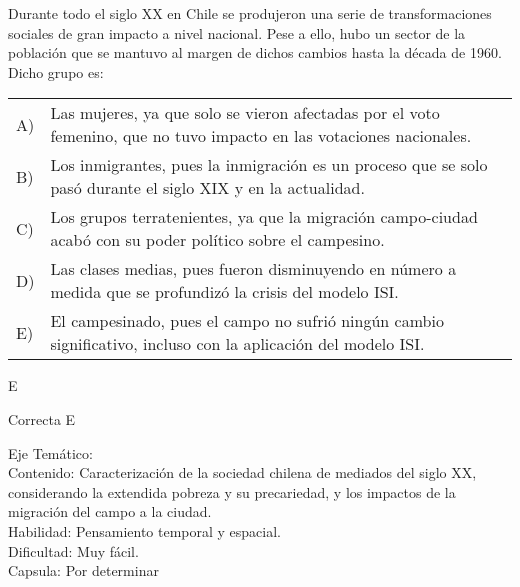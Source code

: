 \documentclass[letterpaper,11pt]{article}
\newcommand{\anchopregunta}{0.9\textwidth}
\begin{document}
\begin{enumerate}
\begin{minipage}{\anchopregunta}
\item Durante todo el siglo XX en Chile se produjeron una serie de transformaciones sociales de gran impacto a nivel nacional. Pese a ello, hubo un sector de la población que se mantuvo al margen de dichos cambios hasta la década de 1960. Dicho grupo es:
\begin{flushleft}\begin{tabular}{@{\hspace{-.001\textwidth}}l@{\hspace{2pt}}p{}}
A)& Las mujeres, ya que solo se vieron afectadas por el voto femenino, que no tuvo impacto en las votaciones nacionales.\\
B)& Los inmigrantes, pues la inmigración es un proceso que se solo pasó durante el siglo XIX y en la actualidad.\\
C)& Los grupos terratenientes, ya que la migración campo-ciudad acabó con su poder político sobre el campesino.\\
D)& Las clases medias, pues fueron disminuyendo en número a medida que se profundizó la crisis del modelo ISI.\\
E)& El campesinado, pues el campo no sufrió ningún cambio significativo, incluso con la aplicación del modelo ISI.\\ 
\end{tabular}\end{flushleft}%
\begin{key} E
\end{key} 
\begin{hint}
\end{hint}
\begin{answer} Correcta E \\
\end{answer}
\begin{info} %
\begin{flushleft}
Eje Temático: \\
Contenido: Caracterización de la sociedad chilena de mediados del siglo XX, considerando la extendida pobreza y su precariedad, y los impactos de la migración del campo a la ciudad.\\
Habilidad: Pensamiento temporal y espacial.\\
Dificultad: Muy fácil.\\
Capsula: Por determinar \\
\end{flushleft} 
\end{info}
\end{minipage}\vfill$\;$ %


\end{enumerate}
\end{document}
